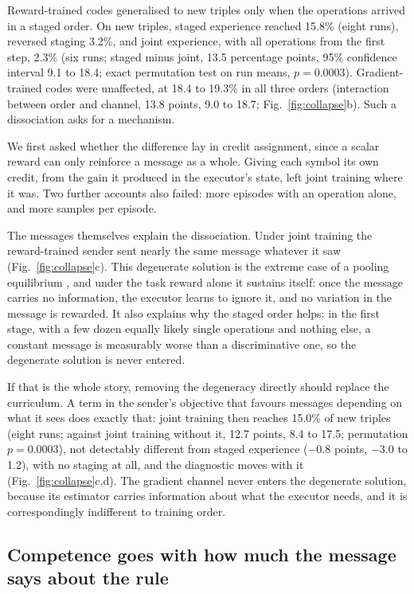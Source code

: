 \documentclass{nature}
\begin{document}
Reward-trained codes generalised to new triples only when the operations arrived in a staged order. On new triples, staged
experience reached 15.8\% (eight runs), reversed staging 3.2\%, and joint experience, with all operations from the
first step, 2.3\% (six runs; staged minus joint, 13.5 percentage points, 95\% confidence interval 9.1 to 18.4;
exact permutation test on run means, $p = 0.0003$). Gradient-trained codes were unaffected, at 18.4 to 19.3\% in
all three orders (interaction between order and channel, 13.8 points, 9.0 to 18.7; Fig.~\ref{fig:collapse}b). Such a dissociation asks for a mechanism.

We first asked whether the difference lay in credit assignment, since a scalar reward can only reinforce a message
as a whole. Giving each symbol its own credit, from the gain it produced in the executor's state, left joint
training where it was. Two further accounts also failed: more episodes with an operation alone, and more samples per episode.

The messages themselves explain the dissociation. Under joint training the reward-trained sender sent nearly the same
message whatever it saw (Fig.~\ref{fig:collapse}c). This degenerate solution is the extreme case of a pooling
equilibrium \cite{skyrms2010,huttegger2010}, and under the task reward alone it sustains itself: once the message
carries no information, the executor learns to ignore it, and no variation in the message is rewarded. It also
explains why the staged order helps: in the first stage, with a few dozen equally likely single operations and
nothing else, a constant message is measurably worse than a discriminative one, so the degenerate solution is
never entered.

If that is the whole story, removing the degeneracy directly should replace the curriculum. A term in the
sender's objective that favours messages depending on what it sees \cite{eccles2019} does exactly that: joint
training then reaches 15.0\% of new triples (eight runs; against joint training without it, 12.7 points, 8.4 to
17.5; permutation $p = 0.0003$), not detectably different from staged experience ($-0.8$ points, $-3.0$ to 1.2),
with no staging at all, and the diagnostic moves with it (Fig.~\ref{fig:collapse}c,d). The gradient channel never
enters the degenerate solution, because its estimator carries information about what the executor needs, and it is
correspondingly indifferent to training order.

\subsection*{Competence goes with how much the message says about the rule}
\end{document}
